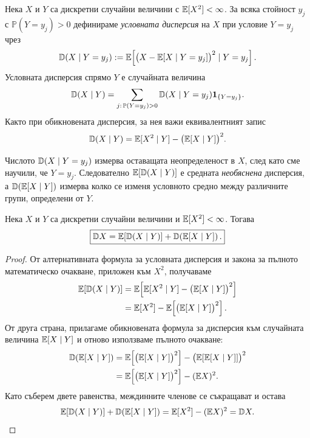 \begin{keydefn}
Нека\label{def:conditional-variance} $X$ и $Y$ са дискретни случайни величини с
$\mathbb{E}[X^2]<\infty$. За всяка стойност $y_j$ с $\mathbb P(Y=y_j)>0$ дефинираме
\emph{условната дисперсия} на $X$ при условие $Y=y_j$ чрез
\[
\mathbb{D}(X\mid Y=y_j)
:=\mathbb{E}\!\left[\bigl(X-\mathbb{E}[X\mid Y=y_j]\bigr)^2\mid Y=y_j\right].
\]
Условната дисперсия спрямо $Y$ е случайната величина
\[
\mathbb{D}(X\mid Y)
=\sum_{j:\,\mathbb P(Y=y_j)>0}\mathbb{D}(X\mid Y=y_j)\mathbf{1}_{\{Y=y_j\}}.
\]
Както при обикновената дисперсия, за нея важи еквивалентният запис
\[
\mathbb{D}(X\mid Y)=\mathbb{E}[X^2\mid Y]-\bigl(\mathbb{E}[X\mid Y]\bigr)^2.
\]
\end{keydefn}

Числото $\mathbb{D}(X\mid Y=y_j)$ измерва оставащата неопределеност в $X$, след като
сме научили, че $Y=y_j$. Следователно $\mathbb{E}[\mathbb{D}(X\mid Y)]$ е средната
\emph{необяснена} дисперсия, а $\mathbb{D}(\mathbb{E}[X\mid Y])$ измерва колко се изменя
условното средно между различните групи, определени от $Y$.

\begin{keythm}
Нека\label{thm:total-variance} $X$ и $Y$ са дискретни случайни величини и
$\mathbb{E}[X^2]<\infty$. Тогава
\[
\boxed{\mathbb{D} X
=\mathbb{E}\!\left[\mathbb{D}(X\mid Y)\right]
+\mathbb{D}\!\left(\mathbb{E}[X\mid Y]\right).}
\]
\end{keythm}

\begin{proof}
От алтернативната формула за условната дисперсия и закона за пълното
математическо очакване, приложен към $X^2$, получаваме
\begin{align*}
\mathbb{E}[\mathbb{D}(X\mid Y)]
&=\mathbb{E}\!\left[\mathbb{E}[X^2\mid Y]-\bigl(\mathbb{E}[X\mid Y]\bigr)^2\right]\\
&=\mathbb{E}[X^2]-\mathbb{E}\!\left[\bigl(\mathbb{E}[X\mid Y]\bigr)^2\right].
\end{align*}
От друга страна, прилагаме обикновената формула за дисперсия към случайната
величина $\mathbb{E}[X\mid Y]$ и отново използваме пълното очакване:
\begin{align*}
\mathbb{D}(\mathbb{E}[X\mid Y])
&=\mathbb{E}\!\left[\bigl(\mathbb{E}[X\mid Y]\bigr)^2\right]
  -\bigl(\mathbb{E}[\mathbb{E}[X\mid Y]]\bigr)^2\\
&=\mathbb{E}\!\left[\bigl(\mathbb{E}[X\mid Y]\bigr)^2\right]-(\mathbb{E} X)^2.
\end{align*}
Като съберем двете равенства, междинните членове се съкращават и остава
\[
\mathbb{E}[\mathbb{D}(X\mid Y)]+\mathbb{D}(\mathbb{E}[X\mid Y])
=\mathbb{E}[X^2]-(\mathbb{E} X)^2=\mathbb{D} X.
\]
\end{proof}

